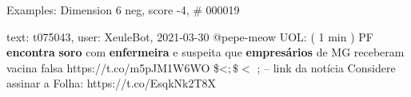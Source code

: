 \begin{frame}{Examples: Dimension 6 neg, score -4, \# 000019}
\footnotesize
\begin{alertblock}{text: t075043, user: XeuleBot, 2021-03-30}
@pepe-meow UOL: ( 1 min ) PF \textbf{encontra} \textbf{soro} com 
\textbf{enfermeira} e suspeita que \textbf{empresários} de MG receberam vacina 
falsa https://t.co/m5pJM1W6WO \$<$ ; \$<$ ; -- link da notícia Considere 
assinar a Folha: https://t.co/EsqkNk2T8X 
\end{alertblock}
\end{frame}
